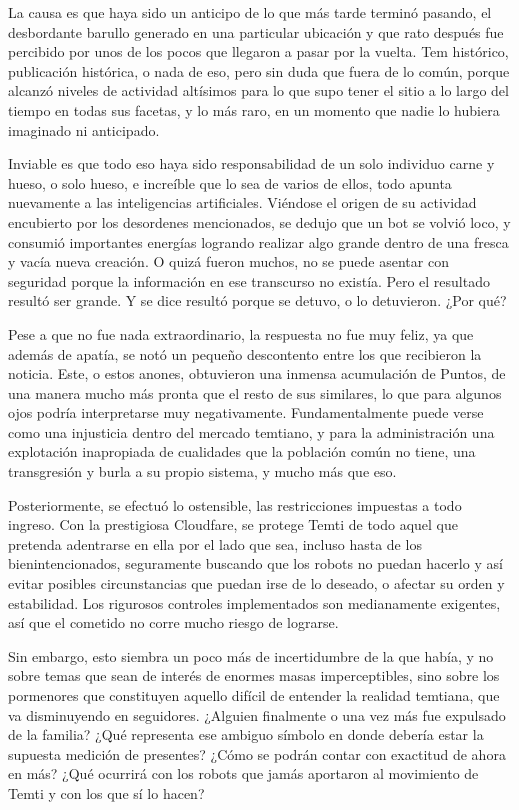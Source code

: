 \documentclass[
]{book}
\begin{document}
La causa es que haya sido un anticipo de lo que más tarde terminó pasando, el desbordante barullo generado en una particular ubicación y que rato después fue percibido por unos de los pocos que llegaron a pasar por la vuelta. Tem histórico, publicación histórica, o nada de eso, pero sin duda que fuera de lo común, porque alcanzó niveles de actividad altísimos para lo que supo tener el sitio a lo largo del tiempo en todas sus facetas, y lo más raro, en un momento que nadie lo hubiera imaginado ni anticipado.

Inviable es que todo eso haya sido responsabilidad de un solo individuo carne y hueso, o solo hueso, e increíble que lo sea de varios de ellos, todo apunta nuevamente a las inteligencias artificiales. Viéndose el origen de su actividad encubierto por los desordenes mencionados, se dedujo que un bot se volvió loco, y consumió importantes energías logrando realizar algo grande dentro de una fresca y vacía nueva creación. O quizá fueron muchos, no se puede asentar con seguridad porque la información en ese transcurso no existía. Pero el resultado resultó ser grande. Y se dice resultó porque se detuvo, o lo detuvieron. ¿Por qué?

Pese a que no fue nada extraordinario, la respuesta no fue muy feliz, ya que además de apatía, se notó un pequeño descontento entre los que recibieron la noticia. Este, o estos anones, obtuvieron una inmensa acumulación de Puntos, de una manera mucho más pronta que el resto de sus similares, lo que para algunos ojos podría interpretarse muy negativamente. Fundamentalmente puede verse como una injusticia dentro del mercado temtiano, y para la administración una explotación inapropiada de cualidades que la población común no tiene, una transgresión y burla a su propio sistema, y mucho más que eso.

Posteriormente, se efectuó lo ostensible, las restricciones impuestas a todo ingreso. Con la prestigiosa Cloudfare, se protege Temti de todo aquel que pretenda adentrarse en ella por el lado que sea, incluso hasta de los bienintencionados, seguramente buscando que los robots no puedan hacerlo y así evitar posibles circunstancias que puedan irse de lo deseado, o afectar su orden y estabilidad. Los rigurosos controles implementados son medianamente exigentes, así que el cometido no corre mucho riesgo de lograrse.

Sin embargo, esto siembra un poco más de incertidumbre de la que había, y no sobre temas que sean de interés de enormes masas imperceptibles, sino sobre los pormenores que constituyen aquello difícil de entender la realidad temtiana, que va disminuyendo en seguidores. ¿Alguien finalmente o una vez más fue expulsado de la familia? ¿Qué representa ese ambiguo símbolo en donde debería estar la supuesta medición de presentes? ¿Cómo se podrán contar con exactitud de ahora en más? ¿Qué ocurrirá con los robots que jamás aportaron al movimiento de Temti y con los que sí lo hacen?
\end{document}
